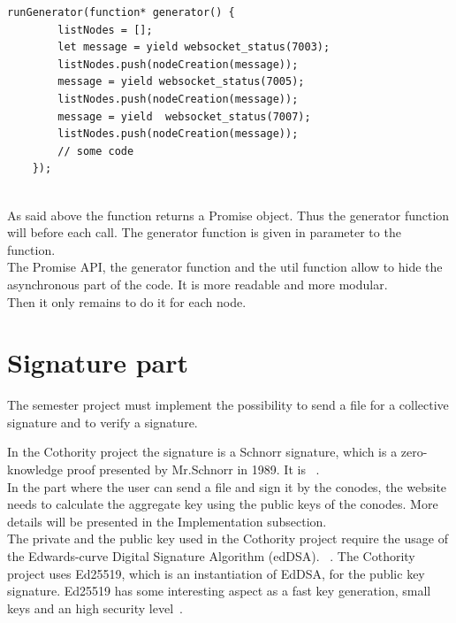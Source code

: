 \documentclass[11pt, a4paper, twoside, openright]{book} %
\begin{document}
\begin{lstlisting}[caption={Extract from the project's code reaching conodes at port 7003, 7005 and 7007}, captionpos=b]
  runGenerator(function* generator() {
        listNodes = [];
        let message = yield websocket_status(7003);
        listNodes.push(nodeCreation(message));
        message = yield websocket_status(7005);
        listNodes.push(nodeCreation(message));
        message = yield  websocket_status(7007);
        listNodes.push(nodeCreation(message));
        // some code
    });
\end{lstlisting}
\leavevmode \\
As said above the  function returns a Promise object. Thus
the generator function  will  before each  call.
The generator function is given in parameter to the  function.\\
The Promise API, the generator function and the util function  allow to hide
the asynchronous part of the code. It is more readable and more modular.\\


Then it only remains to do it for each node.

\section{Signature part}
The semester project must implement the possibility to send a file for a collective signature
and to verify a signature.


In the Cothority project the signature is a Schnorr signature, which is a zero-knowledge proof presented
by Mr.Schnorr in 1989. It is ~\cite{wikiSchnorr}.\\
In the part where the user can send a file and sign it by the conodes,
the website needs to calculate the aggregate key using the public keys of the conodes.
More details will be presented in the Implementation subsection.\\
The private and the public key used in the Cothority project require the usage of
the Edwards-curve Digital Signature Algorithm (edDSA).
~\cite{edDSA}.
The Cothority project uses Ed25519, which is an instantiation of EdDSA, for the
public key signature. Ed25519 has some interesting aspect as a fast key generation,
small keys and an high security level~\cite{ed25519}.\\
\end{document}
